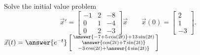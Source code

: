 \documentclass{ximera}
\begin{document}
\begin{exercise}
    Solve the initial value problem
    \[ 
        {\vec{x}}' = 
        \begin{bmatrix}
            -1 & 2 & -8 \\ 
            0 & 1 & -4 \\ 
            0 & 2 & -3 
        \end{bmatrix} 
        \vec{x} \qquad \vec{x}(0) = 
        \begin{bmatrix} 
            2 \\ 
            1 \\ 
            -3 
        \end{bmatrix}. 
    \]
    $\vec{x}(t) = \answer{e^{-t}}\left[\begin{smallmatrix} \answer{-7 + 5\cos(2t)} + 13\sin(2t) \\ \answer{\cos(2t) + 7\sin(2t)} \\ -3\cos(2t) + \answer{4\sin(2t)} \end{smallmatrix}\right]$
\end{exercise}
\end{document}

